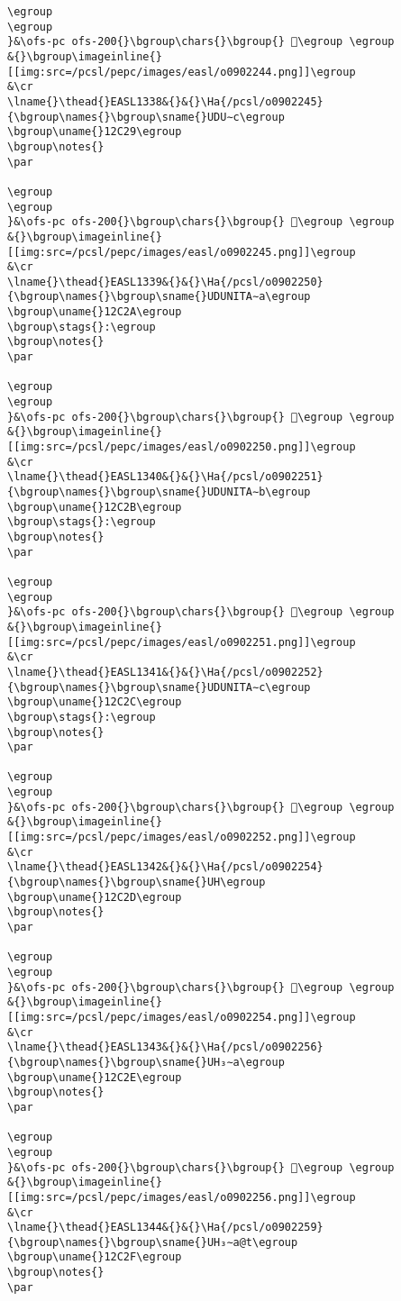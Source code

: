\begin{verbatim}
\egroup
\egroup
}&\ofs-pc ofs-200{}\bgroup\chars{}\bgroup{} 𒰨\egroup \egroup
&{}\bgroup\imageinline{}[[img:src=/pcsl/pepc/images/easl/o0902244.png]]\egroup
&\cr
\lname{}\thead{}EASL1338&{}&{}\Ha{/pcsl/o0902245}{\bgroup\names{}\bgroup\sname{}UDU∼c\egroup
\bgroup\uname{}12C29\egroup
\bgroup\notes{}
\par 

\egroup
\egroup
}&\ofs-pc ofs-200{}\bgroup\chars{}\bgroup{} 𒰩\egroup \egroup
&{}\bgroup\imageinline{}[[img:src=/pcsl/pepc/images/easl/o0902245.png]]\egroup
&\cr
\lname{}\thead{}EASL1339&{}&{}\Ha{/pcsl/o0902250}{\bgroup\names{}\bgroup\sname{}UDUNITA∼a\egroup
\bgroup\uname{}12C2A\egroup
\bgroup\stags{}:\egroup
\bgroup\notes{}
\par 

\egroup
\egroup
}&\ofs-pc ofs-200{}\bgroup\chars{}\bgroup{} 𒰪\egroup \egroup
&{}\bgroup\imageinline{}[[img:src=/pcsl/pepc/images/easl/o0902250.png]]\egroup
&\cr
\lname{}\thead{}EASL1340&{}&{}\Ha{/pcsl/o0902251}{\bgroup\names{}\bgroup\sname{}UDUNITA∼b\egroup
\bgroup\uname{}12C2B\egroup
\bgroup\stags{}:\egroup
\bgroup\notes{}
\par 

\egroup
\egroup
}&\ofs-pc ofs-200{}\bgroup\chars{}\bgroup{} 𒰫\egroup \egroup
&{}\bgroup\imageinline{}[[img:src=/pcsl/pepc/images/easl/o0902251.png]]\egroup
&\cr
\lname{}\thead{}EASL1341&{}&{}\Ha{/pcsl/o0902252}{\bgroup\names{}\bgroup\sname{}UDUNITA∼c\egroup
\bgroup\uname{}12C2C\egroup
\bgroup\stags{}:\egroup
\bgroup\notes{}
\par 

\egroup
\egroup
}&\ofs-pc ofs-200{}\bgroup\chars{}\bgroup{} 𒰬\egroup \egroup
&{}\bgroup\imageinline{}[[img:src=/pcsl/pepc/images/easl/o0902252.png]]\egroup
&\cr
\lname{}\thead{}EASL1342&{}&{}\Ha{/pcsl/o0902254}{\bgroup\names{}\bgroup\sname{}UH\egroup
\bgroup\uname{}12C2D\egroup
\bgroup\notes{}
\par 

\egroup
\egroup
}&\ofs-pc ofs-200{}\bgroup\chars{}\bgroup{} 𒰭\egroup \egroup
&{}\bgroup\imageinline{}[[img:src=/pcsl/pepc/images/easl/o0902254.png]]\egroup
&\cr
\lname{}\thead{}EASL1343&{}&{}\Ha{/pcsl/o0902256}{\bgroup\names{}\bgroup\sname{}UH₃∼a\egroup
\bgroup\uname{}12C2E\egroup
\bgroup\notes{}
\par 

\egroup
\egroup
}&\ofs-pc ofs-200{}\bgroup\chars{}\bgroup{} 𒰮\egroup \egroup
&{}\bgroup\imageinline{}[[img:src=/pcsl/pepc/images/easl/o0902256.png]]\egroup
&\cr
\lname{}\thead{}EASL1344&{}&{}\Ha{/pcsl/o0902259}{\bgroup\names{}\bgroup\sname{}UH₃∼a@t\egroup
\bgroup\uname{}12C2F\egroup
\bgroup\notes{}
\par 


\end{verbatim}
